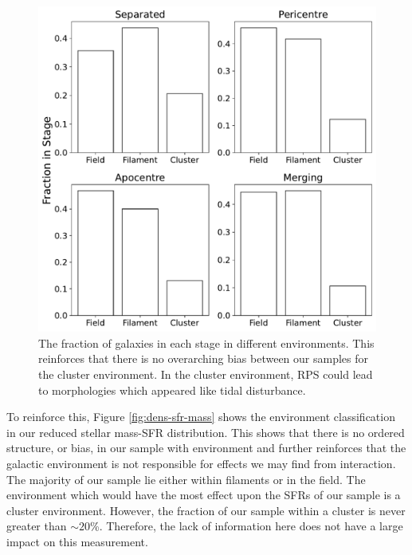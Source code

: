 \begin{figure}
\centering
\includegraphics[width=\textwidth]{Chapter3/figures/environment-fractions.pdf}
\caption[The fraction of galaxies in each stage in different environments.]{The fraction of galaxies in each stage in different environments. This reinforces that there is no overarching bias between our samples for the cluster environment. In the cluster environment, RPS could lead to morphologies which appeared like tidal disturbance.}
\label{fig:environ-fract}
\end{figure}

To reinforce this, Figure \ref{fig:dens-sfr-mass} shows the environment classification in our reduced stellar mass-SFR distribution. This shows that there is no ordered structure, or bias, in our sample with environment and further reinforces that the galactic environment is not responsible for effects we may find from interaction. The majority of our sample lie either within filaments or in the field. The environment which would have the most effect upon the SFRs of our sample is a cluster environment. However, the fraction of our sample within a cluster is never greater than $\sim20$\%. Therefore, the lack of information here does not have a large impact on this measurement. 

